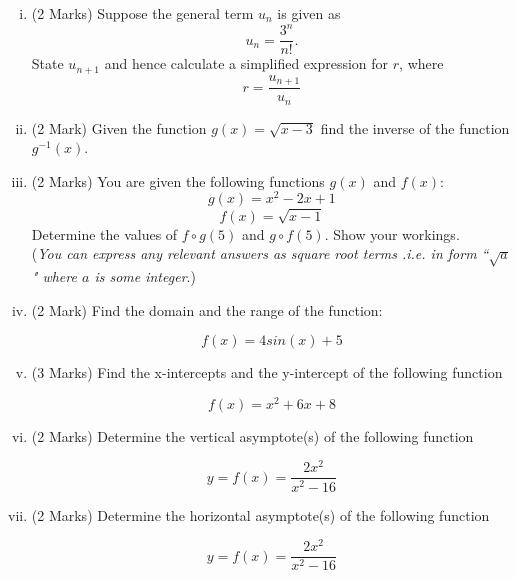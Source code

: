 \documentclass[11pt]{article} %
\begin{document}
\begin{enumerate}[(i)]
	\item (2 Marks) Suppose the general term $u_n$ is given as \[u_n = \displaystyle{\frac{3^n}{n!} } .\]State $u_{n+1}$ and hence calculate a simplified expression for $r$, where 
	{
		\Large
		\[ r = \frac{u_{n+1}}{u_n}\]
	}
\vspace{8.8cm}

	\item (2 Mark) Given the function $g(x) = \sqrt{x-3}$ find the inverse of the function $g^{-1}(x)$.

\newpage


	
	\newpage
		
\newpage

\item (2 Marks) You are given the following functions $g(x)$ and $f(x)$:
\[g(x)= x^2 - 2x  +1\]    \[f(x) = \sqrt{x-1}\] Determine the values of $f \circ g(5)$ and $g \circ f(5)$. Show your workings.\\ (\textit{You can express any relevant answers as square root terms .i.e. in form ``$\sqrt{a}$" where $a$ is some integer}.)

\newpage
	
	
	\item (2 Mark) Find the domain and the range of the function:
	
	\[ f(x) = 4 sin(x)  + 5 \]
	\item (3 Marks) Find the x-intercepts and the y-intercept of the following function

\[ f(x) = x^2 + 6x + 8  \]

	\newpage
	
	\item (2 Marks) Determine the vertical asymptote(s) of the following function


\[ y = f(x) = \frac{2x^2}{x^2-16} \]	

\vspace{5.8cm}
	
	\item (2 Marks) Determine the horizontal asymptote(s) of the following function
	
	\[ y = f(x) = \frac{2x^2}{x^2-16} \]
	
\end{enumerate}
\end{document}
